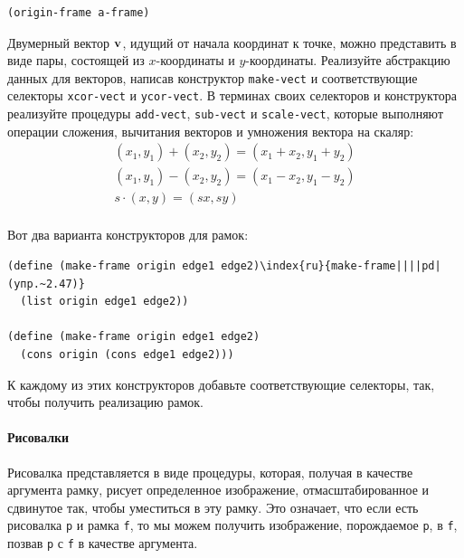 \begin{Verbatim}[fontsize=\small]
(origin-frame a-frame)
\end{Verbatim}
\begin{exercise}{2.46}\label{EX2.46}%
Двумерный    вектор ${\bf v}$, идущий от начала 
координат к точке, можно представить в виде пары, состоящей из
$x$-координаты и $y$-координаты.  Реализуйте
абстракцию данных для векторов, написав конструктор
{\tt make-vect}
и соответствующие селекторы
{\tt xcor-vect} 
и {\tt ycor-vect}. 
В терминах своих
селекторов и конструктора реализуйте процедуры {\tt add-vect},
{\tt sub-vect} и {\tt scale-vect}, которые выполняют
операции сложения, вычитания векторов и умножения вектора на скаляр:
$$
  \begin{array}{c}
    (x_1, y_1) + (x_2, y_2) = (x_1 + x_2, y_1 + y_2) \\
    (x_1, y_1) - (x_2, y_2) = (x_1 - x_2, y_1 - y_2) \\
    s \cdot (x, y) = (sx, sy) \\
  \end{array}
$$
\end{exercise}
\begin{exercise}{2.47}\label{EX2.47}%
Вот два варианта конструкторов для рамок:

\begin{Verbatim}[fontsize=\small]
(define (make-frame origin edge1 edge2)\index{ru}{make-frame||||pd|(упр.~2.47)}
  (list origin edge1 edge2))

(define (make-frame origin edge1 edge2)
  (cons origin (cons edge1 edge2)))
\end{Verbatim}
К каждому из этих конструкторов  добавьте соответствующие селекторы,
так, чтобы получить реализацию рамок.
\end{exercise}

\paragraph{Рисовалки}


 Рисовалка представляется в виде процедуры, которая,
получая в качестве аргумента рамку, рисует определенное изображение,
отмасштабированное и сдвинутое так, чтобы уместиться в эту рамку.  Это 
означает, что если есть рисовалка {\tt p} и рамка
{\tt f}, то мы можем получить изображение, порождаемое
{\tt p}, в {\tt f}, позвав {\tt p} с
{\tt f} в качестве аргумента.


